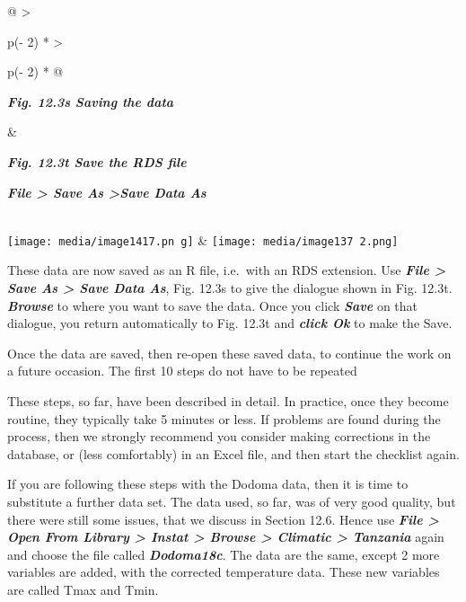 \documentclass[
  letterpaper,
  DIV=11,
  numbers=noendperiod]{scrreprt}
\begin{document}
\begin{longtable}[]{@{}
  >{\raggedright\arraybackslash}p{(\columnwidth - 2\tabcolsep) * }
  >{\raggedright\arraybackslash}p{(\columnwidth - 2\tabcolsep) * }@{}}
\toprule\noalign{}
\begin{minipage}[b]{\linewidth}\raggedright
\textbf{\emph{Fig. 12.3s Saving the data}}
\end{minipage} & \begin{minipage}[b]{\linewidth}\raggedright
\textbf{\emph{Fig. 12.3t Save the RDS file}}

\textbf{\emph{File \textgreater{} Save As \textgreater Save Data As}}
\end{minipage} \\
\midrule\noalign{}
\endhead
\bottomrule\noalign{}
\endlastfoot
\texttt{[image: media/image1417.pn g]}
&
\texttt{[image: media/image137 2.png]} \\
\end{longtable}

These data are now saved as an R file, i.e.~with an RDS extension. Use
\textbf{\emph{File \textgreater{} Save As \textgreater{} Save Data As}},
Fig. 12.3s to give the dialogue shown in Fig. 12.3t.
\textbf{\emph{Browse}} to where you want to save the data. Once you
click \textbf{\emph{Save}} on that dialogue, you return automatically to
Fig. 12.3t and \textbf{\emph{click Ok}} to make the Save.

Once the data are saved, then re-open these saved data, to continue the
work on a future occasion. The first 10 steps do not have to be repeated

These steps, so far, have been described in detail. In practice, once
they become routine, they typically take 5 minutes or less. If problems
are found during the process, then we strongly recommend you consider
making corrections in the database, or (less comfortably) in an Excel
file, and then start the checklist again.

If you are following these steps with the Dodoma data, then it is time
to substitute a further data set. The data used, so far, was of very
good quality, but there were still some issues, that we discuss in
Section 12.6. Hence use \textbf{\emph{File \textgreater{} Open From
Library \textgreater{} Instat \textgreater{} Browse \textgreater{}
Climatic \textgreater{} Tanzania}} again and choose the file called
\textbf{\emph{Dodoma18c}}. The data are the same, except 2 more
variables are added, with the corrected temperature data. These new
variables are called Tmax and Tmin.
\end{document}

